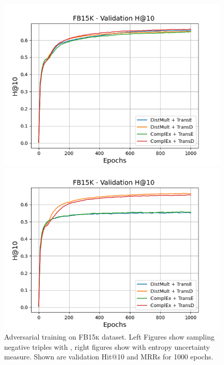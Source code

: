 \begin{figure}[H]
\begin{minipage}{.5\textwidth}
    \end{minipage}
    \begin{minipage}{.5\textwidth}
      \centering
      \includegraphics[width=0.9\linewidth]{figures/results/gan_train/not_pretrained/random/fb15k/1k_epochs/random_fb15k_hit10.png}
    \end{minipage}%
    \begin{minipage}{.5\textwidth}
      \centering
      \includegraphics[width=0.9\linewidth]{figures/results/gan_train/not_pretrained/uncertainty/max_distribution/entropy/fb15k/1k_epochs/uncertainty_fb15k_hit10.png}
    \end{minipage}%
    \caption{Adversarial training on \textsc{FB15k} dataset. 
    Left Figures show sampling negative triples with \origsampling, right figures show \ussoftmax with entropy uncertainty measure.
    Shown are validation Hit@10 and MRRs for 1000 epochs.}
    \label{fig:advtrain_fb15k_random_vs_uncertainty}
\end{figure}

